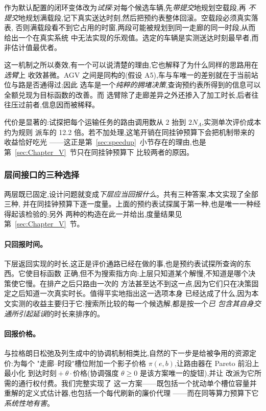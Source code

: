 \documentclass[manuscript,screen,review]{acmart}
\newcommand{\CostMultBefore}{12.2}
\begin{document}
作为默认配置的闭环变体改为\emph{试探}:对每个候选车辆,先\emph{带提交}地规划空载段,再
\emph{不提交}地规划满载段,记下真实送达时刻,然后把预约表整体回滚。空载段必须真实落表,
否则满载段看不到它占用的时窗,两段可能被规划到同一走廊的同一时段,从而给出一个在真实系统
中无法实现的乐观值。选定的车辆是实测送达时刻最早者,而非估计值最优者。

这一机制之所以奏效,有一个可以说清楚的理由,它也解释了为什么同样的思路用在\emph{选臂}上
收效甚微。AGV 之间是同构的(假设 A5),车与车唯一的差别就在于当前站位与路是否通得过;因此
选车是一个\emph{纯粹的拥堵决策},查询预约表所得到的信息可以全额兑现为目标函数的改善。而
选臂除了走廊差异之外还掺入了加工时长,后者往往压过前者,信息因而被稀释。

代价是显著的:试探把每个运输任务的路由调用数从 $2$ 抬到 $2N_A$,实测单次评价成本约为规则
派车的 \CostMultBefore{} 倍。若不加处理,这笔开销在同挂钟预算下会把机制带来的收益恰好吃光
——这正是第~\ref{sec:speedup}~小节存在的理由,也是第~\ref{sec:Chapter_V}~节只在同挂钟预算下
比较两者的原因。

\subsubsection{层间接口的三种选择}
\label{sec:interface}

两层既已固定,设计问题就变成\emph{下层应当回报什么}。共有三种答案,本文实现了全部三种,
并在同挂钟预算下逐一度量。上面的预约表试探属于第一种,也是唯一一种经得起该检验的;另外
两种的构造在此一并给出,度量结果见第~\ref{sec:Chapter_V}~节。

\paragraph{只回报时间。}
下层返回实现的时长,这正是评价通路已经在做的事,也是预约表试探所查询的东西。它使目标函数
正确,但不为搜索指方向:上层只知道某个解慢,不知道是哪个决策使它慢。在排产之后只路由一次的
方法甚至达不到这一点,因为它们只在决策固定之后知道一次真实时长。值得平实地指出这一选项本身
已经达成了什么,因为本文实测的收益主要归于它:搜索所比较的每一个候选解,都是按一个\emph{已
包含其自身交通所引起延误}的时长来排序的。

\paragraph{回报价格。}
与拉格朗日松弛及列生成中的协调机制相类比,自然的下一步是给被争用的资源定价:为每个
"走廊--时段"槽位附加一个影子价格 $\pi(e,b)$,让路由器在 Pareto 前沿上最小化
$\text{到达时刻}+\theta\cdot\text{价格}$(协调强度 $\theta\ge0$ 是该方案唯一的旋钮),并让
改派为它所需的通行权付费。我们完整实现了
这一方案——既包括一个扰动单个槽位容量并重解的定义式估计器,也包括一个每代刷新的廉价代理
——而在同等算力预算下它\emph{系统性地有害}。
\end{document}
